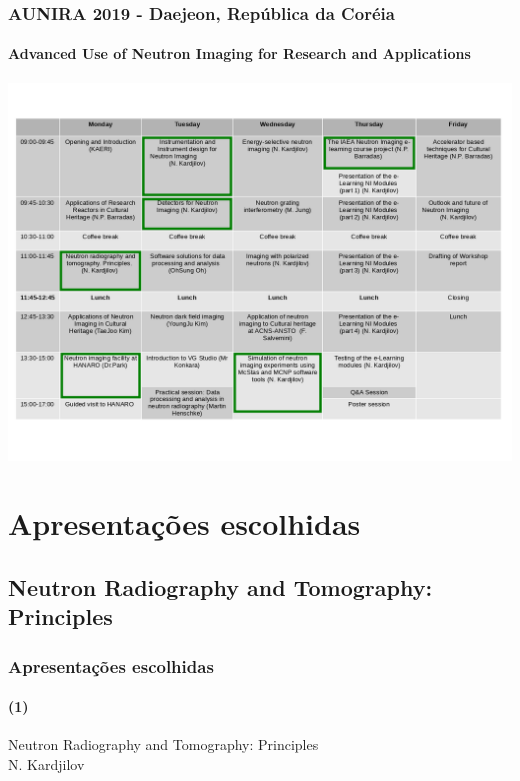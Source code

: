 \documentclass[svgnames,smaller,table]{beamer}
\begin{document}
\begin{frame}
  \frametitle{AUNIRA 2019 - Daejeon, República da Coréia}
  \framesubtitle{Advanced Use of Neutron Imaging for Research and Applications}
  \begin{center}
    \includegraphics[scale=2.0]{figures/agenda-marked.png}
    \end{center}
\end{frame}



\section{Apresentações escolhidas}
\subsection{Neutron Radiography and Tomography: Principles}
\begin{frame}
  \frametitle{Apresentações escolhidas}
  \framesubtitle{(1)}
  \begin{center}
    Neutron Radiography and Tomography: Principles\\
    \vspace{2.0cm}
    N. Kardjilov
  \end{center}
\end{frame}

\begin{frame}
  
\end{frame}
\end{document}
